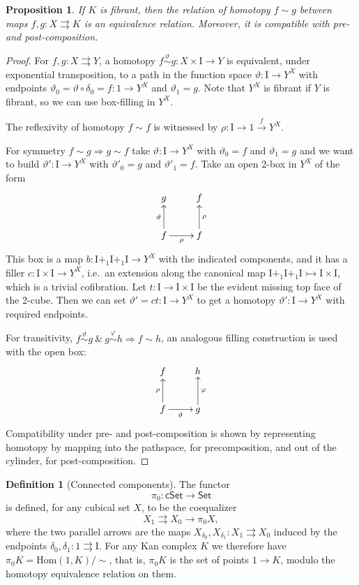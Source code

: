 \documentclass[11pt]{article}
\newcommand{\Set}{\ensuremath{\mathsf{Set}}}
\newcommand{\cSet}{\ensuremath{\mathsf{cSet}}}
\renewcommand{\hom}{\ensuremath{\mathrm{Hom}}}
\newcommand{\mono}{\ensuremath{\rightarrowtail}}
\newcommand{\ra}{\ensuremath{\rightarrow}}
\newcommand{\I}{\ensuremath{\mathrm{I}}}
\newtheorem{proposition}[theorem]{Proposition}
\theoremstyle{remark}
\theoremstyle{definition}
\newtheorem{definition}[theorem]{Definition}
\begin{document}
\begin{proposition}
If $K$ is fibrant, then the relation of homotopy $f \sim g$ between maps $f,g: X\rightrightarrows K$ is an equivalence relation.  Moreover, it is compatible with pre- and post-composition. 
\end{proposition}
\begin{proof}
For $f, g: X\rightrightarrows Y$, a homotopy $f\stackrel{\vartheta}{\sim} g : X\times\I \to Y$ is equivalent, under exponential transposition, to a path in the function space $\vartheta : \I\ra Y^X$ with endpoints $\vartheta_0 = \vartheta\circ\delta_0 = f: 1\ra Y^X$ and $\vartheta_1 = g$.  Note that $Y^X$ is fibrant if $Y$ is fibrant, so we can use box-filling in $Y^X$.    

The reflexivity of homotopy $f\sim f$ is witnessed by $\rho:\I \ra 1 \stackrel{f}{\ra} Y^X$.  

For symmetry $f\sim g\Rightarrow g\sim f$ take $\vartheta : \I\ra Y^X$ with $\vartheta_0 = f$ and $\vartheta_1 = g$ and we want to build $\vartheta' : \I\ra Y^X$ with $\vartheta'_0 = g$ and $\vartheta'_1 = f$. Take an open 2-box in $Y^X$ of the form
\begin{equation*}%
\xymatrix{
g  & f  \\
f \ar[u]^{\vartheta} \ar[r]_\rho & f \ar[u]_\rho
}
\end{equation*}
This box is a map $b : \I+_1 \I +_1 \I \to Y^X$ with the indicated components, and it has a filler $c : \I\times \I \to Y^X$, i.e.\ an extension along the canonical map $\I+_1 \I +_1 \I \mono \I\times\I$, which is a trivial cofibration.  Let $t : \I\ra \I\times\I$ be the evident missing top face of the 2-cube.  Then we can set $\vartheta' = ct : \I \ra Y^X$ to get a homotopy $\vartheta' : \I\ra Y^X$ with required endpoints.

For transitivity, $f\stackrel{\vartheta}{\sim} g\ \&\ g\stackrel{\varphi}{\sim} h\Rightarrow f\sim h$, an analogous filling construction is used with the open box:
\begin{equation*}%
\xymatrix{
f  & h  \\
f \ar[u]^{\rho} \ar[r]_\vartheta & g \ar[u]_\varphi
}
\end{equation*}
Compatibility under pre- and post-composition is shown by representing homotopy by mapping into the pathspace, for precomposition, and out of the cylinder, for post-composition.
\end{proof}

\begin{definition}[Connected components]
The functor $$\pi_0 : \cSet\to\Set$$ is defined, for any cubical set $X$, to be the coequalizer $$X_1\rightrightarrows X_0\ra \pi_0X,$$ where the two parallel arrows are the maps $X_{\delta_0}, X_{\delta_1} : X_1 \rightrightarrows X_0$ induced by the endpoints $\delta_0, \delta_1 : 1 \rightrightarrows \I$.   For any Kan complex $K$ we therefore have $\pi_0K = \hom(1,K)/\!\!\sim$, that is, $\pi_0K$ is the set of points $1\ra K$, modulo the homotopy equivalence relation on them.
\end{definition}
\end{document}
